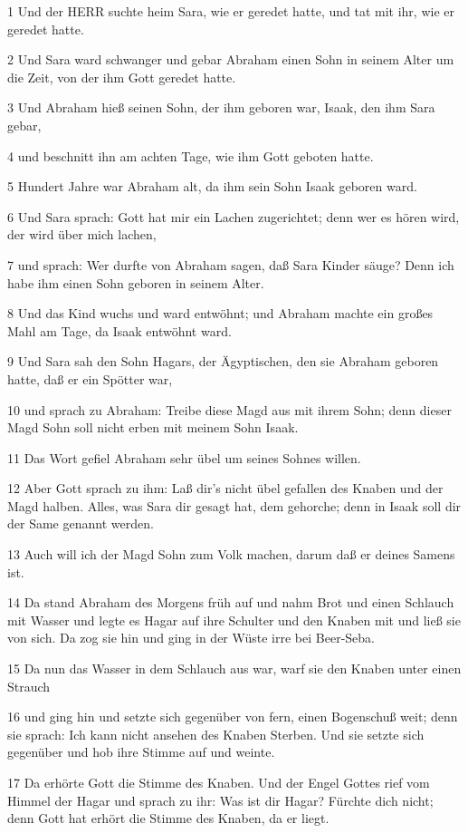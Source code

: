 \par 1 Und der HERR suchte heim Sara, wie er geredet hatte, und tat mit ihr, wie er geredet hatte.
\par 2 Und Sara ward schwanger und gebar Abraham einen Sohn in seinem Alter um die Zeit, von der ihm Gott geredet hatte.
\par 3 Und Abraham hieß seinen Sohn, der ihm geboren war, Isaak, den ihm Sara gebar,
\par 4 und beschnitt ihn am achten Tage, wie ihm Gott geboten hatte.
\par 5 Hundert Jahre war Abraham alt, da ihm sein Sohn Isaak geboren ward.
\par 6 Und Sara sprach: Gott hat mir ein Lachen zugerichtet; denn wer es hören wird, der wird über mich lachen,
\par 7 und sprach: Wer durfte von Abraham sagen, daß Sara Kinder säuge? Denn ich habe ihm einen Sohn geboren in seinem Alter.
\par 8 Und das Kind wuchs und ward entwöhnt; und Abraham machte ein großes Mahl am Tage, da Isaak entwöhnt ward.
\par 9 Und Sara sah den Sohn Hagars, der Ägyptischen, den sie Abraham geboren hatte, daß er ein Spötter war,
\par 10 und sprach zu Abraham: Treibe diese Magd aus mit ihrem Sohn; denn dieser Magd Sohn soll nicht erben mit meinem Sohn Isaak.
\par 11 Das Wort gefiel Abraham sehr übel um seines Sohnes willen.
\par 12 Aber Gott sprach zu ihm: Laß dir's nicht übel gefallen des Knaben und der Magd halben. Alles, was Sara dir gesagt hat, dem gehorche; denn in Isaak soll dir der Same genannt werden.
\par 13 Auch will ich der Magd Sohn zum Volk machen, darum daß er deines Samens ist.
\par 14 Da stand Abraham des Morgens früh auf und nahm Brot und einen Schlauch mit Wasser und legte es Hagar auf ihre Schulter und den Knaben mit und ließ sie von sich. Da zog sie hin und ging in der Wüste irre bei Beer-Seba.
\par 15 Da nun das Wasser in dem Schlauch aus war, warf sie den Knaben unter einen Strauch
\par 16 und ging hin und setzte sich gegenüber von fern, einen Bogenschuß weit; denn sie sprach: Ich kann nicht ansehen des Knaben Sterben. Und sie setzte sich gegenüber und hob ihre Stimme auf und weinte.
\par 17 Da erhörte Gott die Stimme des Knaben. Und der Engel Gottes rief vom Himmel der Hagar und sprach zu ihr: Was ist dir Hagar? Fürchte dich nicht; denn Gott hat erhört die Stimme des Knaben, da er liegt.
